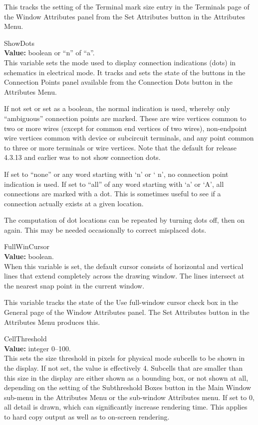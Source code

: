 \begin{description}
This tracks the setting of the {\cb Terminal mark size} entry in the
{\cb Terminals} page of the {\cb Window Attributes} panel from the
{\cb Set Attributes} button in the {\cb Attributes Menu}.

\item{\et ShowDots}\\
{\bf Value:} boolean or ``{\vt n}'' of ``{\vt a}''.\\
This variable sets the mode used to display connection indications
(dots) in schematics in electrical mode.  It tracks and sets the state
of the buttons in the {\cb Connection Points} panel available from the
{\cb Connection Dots} button in the {\cb Attributes Menu}.

If not set or set as a boolean, the normal indication is used, whereby
only ``ambiguous'' connection points are marked.  These are wire
vertices common to two or more wires (except for common end vertices
of two wires), non-endpoint wire vertices common with device or
subcircuit terminals, and any point common to three or more terminals
or wire vertices.  Note that the default for release 4.3.13 and
earlier was to not show connection dots.

If set to ``{\vt none}'' or any word starting with `{\vt n}' or `{\vt
n}', no connection point indication is used.  If set to ``{\vt all}''
of any word starting with `{\vt a}' or `{\vt A}', all connections are
marked with a dot.  This is sometimes useful to see if a connection
actually exists at a given location.

The computation of dot locations can be repeated by turning dots off,
then on again.  This may be needed occasionally to correct misplaced
dots.

\item{\et FullWinCursor}\\
{\bf Value:} boolean.\\
When this variable is set, the default cursor consists of horizontal
and vertical lines that extend completely across the drawing window. 
The lines intersect at the nearest snap point in the current window.

This variable tracks the state of the {\cb Use full-window cursor}
check box in the {\cb General} page of the {\cb Window Attributes}
panel.  The {\cb Set Attributes} button in the {\cb Attributes Menu}
produces this.

\item{\et CellThreshold}\\
{\bf Value:} integer 0--100.\\
This sets the size threshold in pixels for physical mode subcells to
be shown in the display.  If not set, the value is effectively 4. 
Subcells that are smaller than this size in the display are either
shown as a bounding box, or not shown at all, depending on the setting
of the {\cb Subthreshold Boxes} button in the {\cb Main Window}
sub-menu in the {\cb Attributes Menu} or the sub-window {\cb
Attributes} menu.  If set to 0, all detail is drawn, which can
significantly increase rendering time.  This applies to hard copy
output as well as to on-screen rendering.


\end{description}
